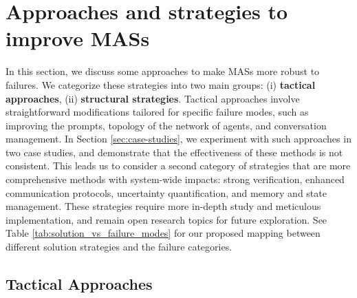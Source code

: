 \section{Approaches and strategies to improve MASs}
\label{sec:better-mas}

In this section, we discuss some approaches to make MASs more robust to failures.
We categorize these strategies into two main groups:
(i) \textbf{tactical approaches}, 
(ii) \textbf{structural strategies}. 
Tactical approaches involve straightforward modifications tailored for specific failure modes, such as improving the prompts, topology of the network of agents, and conversation management. 
In Section \ref{sec:case-studies}, we experiment with such approaches in two case studies, and demonstrate that the effectiveness of these methods is not consistent. 
This leads us to consider a second category of strategies that are more comprehensive methods with system-wide impacts: 
strong verification, enhanced communication protocols, uncertainty quantification, and memory and state management. 
These strategies require more in-depth study and meticulous implementation, and remain open research topics for future exploration. See Table \ref{tab:solution_vs_failure_modes} for our proposed mapping between different solution strategies and the failure categories. 


\subsection{Tactical Approaches}
\label{sec:tactical_approaches}

